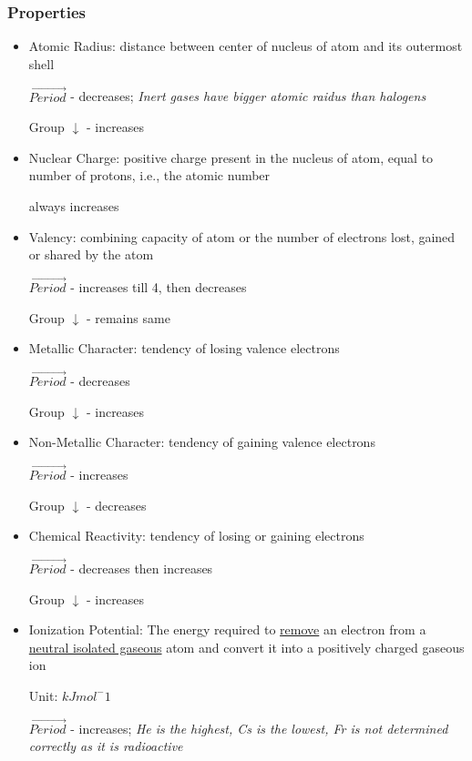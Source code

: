 \documentclass[a4paper]{article}
\begin{document}
	\subsubsection{Properties}
	\begin{itemize}
		\item Atomic Radius: distance between center of nucleus of atom and its outermost shell

			$\vec{{Period}}$ - decreases; \it{Inert gases have bigger atomic raidus than halogens}

			Group $\downarrow$ - increases

		\item Nuclear Charge: positive charge present in the nucleus of atom, equal to number of protons, i.e., the atomic number

			always increases

		\item Valency: combining capacity of atom or the number of electrons lost, gained or shared by the atom

			$\vec{{Period}}$ - increases till 4, then decreases

			Group $\downarrow$ - remains same

		\item Metallic Character: tendency of losing valence electrons

			$\vec{{Period}}$ - decreases

			Group $\downarrow$ - increases

		\item Non-Metallic Character: tendency of gaining valence electrons

			$\vec{{Period}}$ - increases

			Group $\downarrow$ - decreases

		\item Chemical Reactivity: tendency of losing or gaining electrons

			$\vec{{Period}}$ - decreases then increases

			Group $\downarrow$ - increases

		\item Ionization Potential: The energy required to \underline{remove} an electron from a \underline{neutral isolated gaseous} atom and convert it into a positively charged gaseous ion

			Unit: $kJ mol^-1$

			$\vec{{Period}}$ - increases; \it{He is the highest, Cs is the lowest, Fr is not determined correctly as it is radioactive}


\end{itemize}
\end{document}
